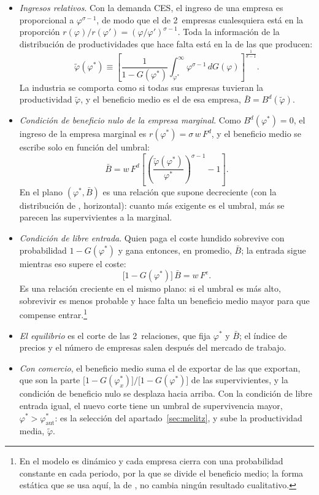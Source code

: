 \documentclass[11pt]{article}
\begin{document}
\begin{itemize}
\item \emph{Ingresos relativos}. Con la demanda CES, el ingreso de una empresa es proporcional a $\varphi^{\sigma-1}$, de modo que el de 2~empresas cualesquiera está en la proporción $r(\varphi)/r(\varphi')=(\varphi/\varphi')^{\sigma-1}$. Toda la información de la distribución de productividades que hace falta está en la  de las que producen:
  $$\tilde\varphi(\varphi^*)\equiv\left[\frac{1}{1-G(\varphi^*)}\int_{\varphi^*}^{\infty}\varphi^{\sigma-1}\,dG(\varphi)\right]^{\frac{1}{\sigma-1}}.$$
  La industria se comporta como si todas sus empresas tuvieran la productividad $\tilde\varphi$, y el beneficio medio es el de esa empresa, $\bar B=B^d(\tilde\varphi)$.
\item \emph{Condición de beneficio nulo de la empresa marginal}. Como $B^d(\varphi^*)=0$, el ingreso de la empresa marginal es $r(\varphi^*)=\sigma\,w\,F^d$, y el beneficio medio se escribe solo en función del umbral:
  $$\bar B=w\,F^d\left[\left(\frac{\tilde\varphi(\varphi^*)}{\varphi^*}\right)^{\sigma-1}-1\right].$$
  En el plano $(\varphi^*,\bar B)$ es una relación que \textcite{Melitz2003Impact} supone decreciente (con la distribución de , horizontal): cuanto más exigente es el umbral, más se parecen las supervivientes a la marginal.
\item \emph{Condición de libre entrada}. Quien paga el coste hundido sobrevive con probabilidad $1-G(\varphi^*)$ y gana entonces, en promedio, $\bar B$; la entrada sigue mientras eso supere el coste:
  $$\big[1-G(\varphi^*)\big]\,\bar B=w\,F^e.$$
  Es una relación creciente en el mismo plano: si el umbral es más alto, sobrevivir es menos probable y hace falta un beneficio medio mayor para que compense entrar.\footnote{En \textcite{Melitz2003Impact} el modelo es dinámico y cada empresa cierra con una probabilidad constante en cada periodo, por la que se divide el beneficio medio; la forma estática que se usa aquí, la de \textcite{MelitzRedding2014Heterogeneous}, no cambia ningún resultado cualitativo.}
\item \emph{El equilibrio} es el corte de las 2~relaciones, que fija $\varphi^*$ y $\bar B$; el índice de precios y el número de empresas salen después del mercado de trabajo.\findemo
\item \emph{Con comercio}, el beneficio medio suma el de exportar de las que exportan, que son la parte $\big[1-G(\varphi^*_x)\big]/\big[1-G(\varphi^*)\big]$ de las supervivientes, y la condición de beneficio nulo se desplaza hacia arriba. Con la condición de libre entrada igual, el nuevo corte tiene un umbral de supervivencia mayor, $\varphi^*>\varphi^*_{\mathrm{aut}}$: es la selección del apartado~\ref{sec:melitz}, y sube la productividad media, $\tilde\varphi$.

\end{itemize}
\end{document}
